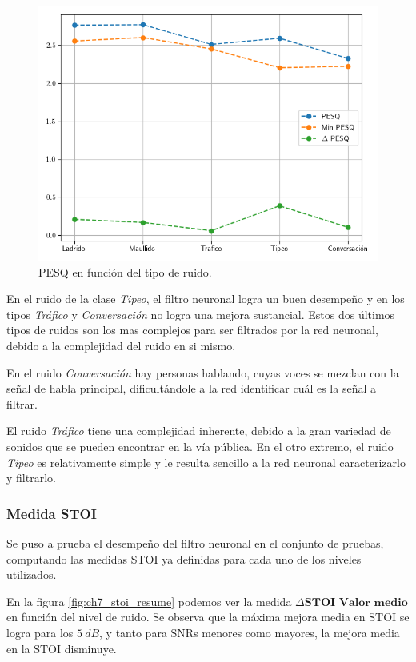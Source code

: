 \begin{figure}
	\centering
	\centerline{\includegraphics[scale=0.75]{images/ch7/dnn_metric_PESQ_noises.png}}
	\caption{PESQ en función del tipo de ruido.}
	\label{fig:ch7_pesq_resume_by_noise}
\end{figure} 

En el ruido de la clase \emph{Tipeo}, el filtro neuronal logra un buen desempeño y en los tipos \emph{Tráfico} y \emph{Conversación} no logra una mejora sustancial. Estos dos últimos tipos de ruidos son los mas complejos para ser filtrados por la red neuronal, debido a la complejidad del ruido en si mismo. 

En el ruido \emph{Conversación} hay personas hablando, cuyas voces se mezclan con la señal de habla principal, dificultándole a la red identificar cuál es la señal a filtrar.

El ruido \emph{Tráfico} tiene una complejidad inherente, debido a la gran variedad de sonidos que se pueden encontrar en la vía pública. En el otro extremo, el ruido \emph{Tipeo} es relativamente simple y le resulta sencillo a la red neuronal caracterizarlo y filtrarlo.


\subsubsection{Medida STOI}

Se puso a prueba el desempeño del filtro neuronal en el conjunto de pruebas, computando las medidas STOI ya definidas para cada uno de los niveles utilizados. 

En la figura \ref{fig:ch7_stoi_resume} podemos ver la medida $\Delta \textbf{STOI Valor medio}$ en función del nivel de ruido. Se observa que la máxima mejora media en STOI se logra para los $\SI{5}{dB}$, y tanto para SNRs menores como mayores, la mejora media en la STOI disminuye.

